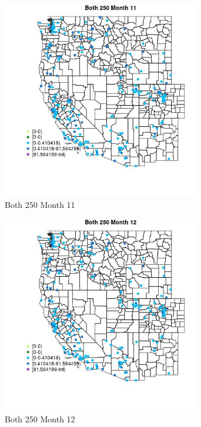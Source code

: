 \begin{figure} 
\centering  
\includegraphics[width=0.77\textwidth]{Code_Outputs/Report_ML_input_PM25_Step4_part_e_de_duplicated_aveswNAs_MapObsMo11Both_250.jpg} 
\caption{\label{fig:Report_ML_input_PM25_Step4_part_e_de_duplicated_aveswNAsMapObsMo11Both_250}Both 250 Month 11} 
\end{figure} 
 

\begin{figure} 
\centering  
\includegraphics[width=0.77\textwidth]{Code_Outputs/Report_ML_input_PM25_Step4_part_e_de_duplicated_aveswNAs_MapObsMo12Both_250.jpg} 
\caption{\label{fig:Report_ML_input_PM25_Step4_part_e_de_duplicated_aveswNAsMapObsMo12Both_250}Both 250 Month 12} 
\end{figure} 
 

